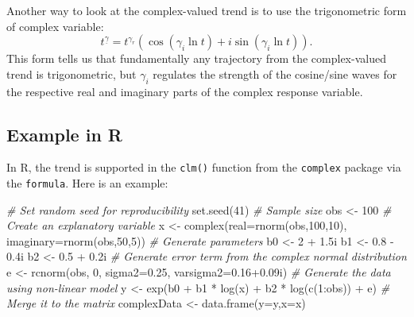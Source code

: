 \documentclass[
]{book}
\newenvironment{Shaded}{\begin{snugshade}}{\end{snugshade}}
\newcommand{\AttributeTok}[1]{\textcolor[rgb]{0.77,0.63,0.00}{#1}}
\newcommand{\CommentTok}[1]{\textcolor[rgb]{0.56,0.35,0.01}{\textit{#1}}}
\newcommand{\DecValTok}[1]{\textcolor[rgb]{0.00,0.00,0.81}{#1}}
\newcommand{\FloatTok}[1]{\textcolor[rgb]{0.00,0.00,0.81}{#1}}
\newcommand{\FunctionTok}[1]{\textcolor[rgb]{0.00,0.00,0.00}{#1}}
\newcommand{\NormalTok}[1]{#1}
\newcommand{\OtherTok}[1]{\textcolor[rgb]{0.56,0.35,0.01}{#1}}
\newcommand{\SpecialCharTok}[1]{\textcolor[rgb]{0.00,0.00,0.00}{#1}}
\begin{document}
Another way to look at the complex-valued trend is to use the trigonometric form of complex variable:
\begin{equation}
    t^{\underline{\gamma}} = t^{\gamma_r} \left(\cos (\gamma_i \ln t) + i \sin (\gamma_i \ln t) \right) .
    \label{eq:trendTrig}
\end{equation}
This form tells us that fundamentally any trajectory from the complex-valued trend is trigonometric, but \(\gamma_i\) regulates the strength of the cosine/sine waves for the respective real and imaginary parts of the complex response variable.

\hypertarget{example-in-r}{%
\subsection{Example in R}\label{example-in-r}}

In R, the trend is supported in the \texttt{clm()} function from the \texttt{complex} package via the \texttt{formula}. Here is an example:

\begin{Shaded}
\begin{Highlighting}[]
\CommentTok{\# Set random seed for reproducibility}
\FunctionTok{set.seed}\NormalTok{(}\DecValTok{41}\NormalTok{)}
\CommentTok{\# Sample size}
\NormalTok{obs }\OtherTok{\textless{}{-}} \DecValTok{100}
\CommentTok{\# Create an explanatory variable}
\NormalTok{x }\OtherTok{\textless{}{-}} \FunctionTok{complex}\NormalTok{(}\AttributeTok{real=}\FunctionTok{rnorm}\NormalTok{(obs,}\DecValTok{100}\NormalTok{,}\DecValTok{10}\NormalTok{), }\AttributeTok{imaginary=}\FunctionTok{rnorm}\NormalTok{(obs,}\DecValTok{50}\NormalTok{,}\DecValTok{5}\NormalTok{))}
\CommentTok{\# Generate parameters}
\NormalTok{b0 }\OtherTok{\textless{}{-}} \DecValTok{2} \SpecialCharTok{+} \FloatTok{1.5}\NormalTok{i}
\NormalTok{b1 }\OtherTok{\textless{}{-}} \FloatTok{0.8} \SpecialCharTok{{-}} \FloatTok{0.4}\NormalTok{i}
\NormalTok{b2 }\OtherTok{\textless{}{-}} \FloatTok{0.5} \SpecialCharTok{+} \FloatTok{0.2}\NormalTok{i}
\CommentTok{\# Generate error term from the complex normal distribution}
\NormalTok{e }\OtherTok{\textless{}{-}} \FunctionTok{rcnorm}\NormalTok{(obs, }\DecValTok{0}\NormalTok{, }\AttributeTok{sigma2=}\FloatTok{0.25}\NormalTok{, }\AttributeTok{varsigma2=}\FloatTok{0.16+0.09}\NormalTok{i)}
\CommentTok{\# Generate the data using non{-}linear model}
\NormalTok{y }\OtherTok{\textless{}{-}} \FunctionTok{exp}\NormalTok{(b0 }\SpecialCharTok{+}\NormalTok{ b1 }\SpecialCharTok{*} \FunctionTok{log}\NormalTok{(x) }\SpecialCharTok{+}\NormalTok{ b2 }\SpecialCharTok{*} \FunctionTok{log}\NormalTok{(}\FunctionTok{c}\NormalTok{(}\DecValTok{1}\SpecialCharTok{:}\NormalTok{obs)) }\SpecialCharTok{+}\NormalTok{ e)}
\CommentTok{\# Merge it to the matrix}
\NormalTok{complexData }\OtherTok{\textless{}{-}} \FunctionTok{data.frame}\NormalTok{(}\AttributeTok{y=}\NormalTok{y,}\AttributeTok{x=}\NormalTok{x)}
\end{Highlighting}
\end{Shaded}
\end{document}
